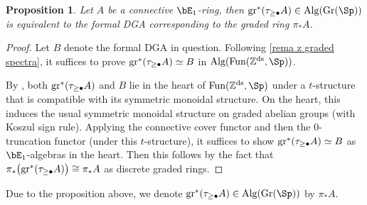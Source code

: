 \documentclass[english,10pt]{amsart}
\newtheorem{prop}{Proposition}[section]
\theoremstyle{definition}
\numberwithin{equation}{section}
\newcommand{\pis}{\pi_*}
\newcommand{\Gr}{\textup{Gr}}
\begin{document}
\begin{prop}\label{prop assoc graded is the formal dga}
Let $A$ be a connective $\bE_1$-ring, then $\textup{gr}^*(\tau_{\geq \bullet}A) \in \textup{Alg}(\Gr(\Sp))$ is equivalent to the formal DGA corresponding to the graded ring $\pis A$. 
\end{prop}
\begin{proof}
Let $B$ denote the formal DGA in question. Following \autoref{rema z graded spectra}, it suffices to prove   $\textup{gr}^*(\tau_{\geq \bullet}A)\simeq B $ in $\textup{Alg}(\textup{Fun}(\mathbb{Z}^{\textup{ds}}, \Sp))$.

By \cite[Construction 3.3.2 (b) and Remark 3.3.3]{raksit2020hochschild}, both $\textup{gr}^*(\tau_{\geq \bullet}A)$ and $B$ lie in the heart of $\textup{Fun}(\mathbb{Z}^{\textup{ds}}, \Sp)$ under a $t$-structure that is compatible with its symmetric monoidal structure.  On the heart, this induces the usual symmetric monoidal structure on graded abelian groups (with Koszul sign rule). Applying the connective cover functor and then the $0$-truncation functor (under this $t$-structure), it suffices to show  $\textup{gr}^*(\tau_{\geq \bullet}A)\simeq B$ as $\bE_1$-algebras in the heart. Then this follows by the fact that $\pis \big(\textup{gr}^*(\tau_{\geq \bullet}A)\big) \cong \pis A$ as discrete graded rings.  
\end{proof}
Due to the proposition above, we denote $\textup{gr}^*(\tau_{\geq \bullet}A) \in \textup{Alg}(\Gr(\Sp))$ by $\pi_*A$.
\end{document}
